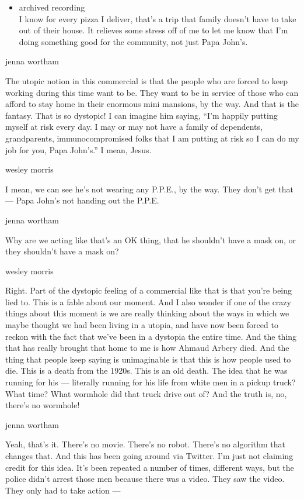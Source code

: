 \begin{itemize}
\tightlist
\item
  archived recording\\
  I know for every pizza I deliver, that's a trip that family doesn't
  have to take out of their house. It relieves some stress off of me to
  let me know that I'm doing something good for the community, not just
  Papa John's.
\end{itemize}

jenna wortham

The utopic notion in this commercial is that the people who are forced
to keep working during this time want to be. They want to be in service
of those who can afford to stay home in their enormous mini mansions, by
the way. And that is the fantasy. That is so dystopic! I can imagine him
saying, ``I'm happily putting myself at risk every day. I may or may not
have a family of dependents, grandparents, immunocompromised folks that
I am putting at risk so I can do my job for you, Papa John's.'' I mean,
Jesus.

wesley morris

I mean, we can see he's not wearing any P.P.E., by the way. They don't
get that --- Papa John's not handing out the P.P.E.

jenna wortham

Why are we acting like that's an OK thing, that he shouldn't have a mask
on, or they shouldn't have a mask on?

wesley morris

Right. Part of the dystopic feeling of a commercial like that is that
you're being lied to. This is a fable about our moment. And I also
wonder if one of the crazy things about this moment is we are really
thinking about the ways in which we maybe thought we had been living in
a utopia, and have now been forced to reckon with the fact that we've
been in a dystopia the entire time. And the thing that has really
brought that home to me is how Ahmaud Arbery died. And the thing that
people keep saying is unimaginable is that this is how people used to
die. This is a death from the 1920s. This is an old death. The idea that
he was running for his --- literally running for his life from white men
in a pickup truck? What time? What wormhole did that truck drive out of?
And the truth is, no, there's no wormhole!

jenna wortham

Yeah, that's it. There's no movie. There's no robot. There's no
algorithm that changes that. And this has been going around via Twitter.
I'm just not claiming credit for this idea. It's been repeated a number
of times, different ways, but the police didn't arrest those men because
there was a video. They saw the video. They only had to take action ---

